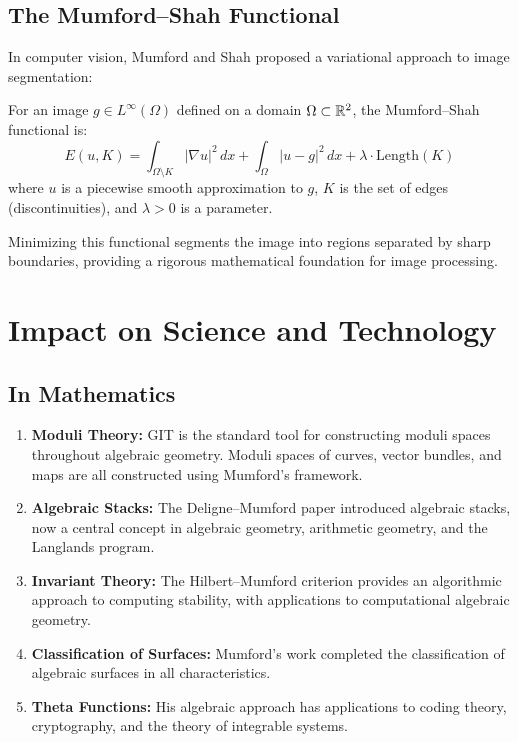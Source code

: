 \subsection{The Mumford--Shah Functional}

In computer vision, Mumford and Shah proposed a variational approach to image segmentation:

\begin{definition}
For an image $g \in L^\infty(\Omega)$ defined on a domain $\Omega \subset \mathbb{R}^2$, the Mumford--Shah functional is:
\[
E(u, K) = \int_{\Omega \setminus K} |\nabla u|^2 \, dx + \int_{\Omega} |u - g|^2 \, dx + \lambda \cdot \text{Length}(K)
\]
where $u$ is a piecewise smooth approximation to $g$, $K$ is the set of edges (discontinuities), and $\lambda > 0$ is a parameter.
\end{definition}

Minimizing this functional segments the image into regions separated by sharp boundaries, providing a rigorous mathematical foundation for image processing.

\section{Impact on Science and Technology}

\subsection{In Mathematics}

\begin{enumerate}
    \item \textbf{Moduli Theory:} GIT is the standard tool for constructing moduli spaces throughout algebraic geometry. Moduli spaces of curves, vector bundles, and maps are all constructed using Mumford's framework.
    \item \textbf{Algebraic Stacks:} The Deligne--Mumford paper introduced algebraic stacks, now a central concept in algebraic geometry, arithmetic geometry, and the Langlands program.
    \item \textbf{Invariant Theory:} The Hilbert--Mumford criterion provides an algorithmic approach to computing stability, with applications to computational algebraic geometry.
    \item \textbf{Classification of Surfaces:} Mumford's work completed the classification of algebraic surfaces in all characteristics.
    \item \textbf{Theta Functions:} His algebraic approach has applications to coding theory, cryptography, and the theory of integrable systems.
\end{enumerate}

